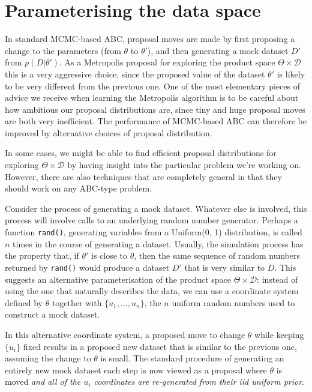 \documentclass[a4paper, 12pt]{article}
\newcommand{\params}{\theta}
\newcommand{\data}{D}
\begin{document}
\section{Parameterising the data space}
In standard MCMC-based ABC, proposal moves are made by first proposing a
change to the parameters (from $\params$ to $\params'$), and then generating
a mock dataset $\data'$ from $p(\data | \params')$. As a Metropolis proposal
for exploring the product space $\Theta \times \mathcal{D}$ this is a very
aggressive choice, since the proposed value of the
dataset $\params'$ is likely to be very different from the previous one.
One of the most elementary pieces of advice we receive when learning the
Metropolis algorithm is to be careful about how ambitious our proposal
distributions are, since tiny and huge proposal moves are both very
inefficient. The performance of MCMC-based ABC can therefore be improved by
alternative choices of proposal distribution.

In some cases, we might be able to find efficient proposal distributions for exploring $\Theta \times \mathcal{D}$ by having insight into the particular
problem we're working on. However, there are also techniques that are
completely general in that they should work on any ABC-type problem.

Consider the process of generating a mock dataset. Whatever else is involved,
this process will involve calls to an underlying random number generator.
Perhaps a function {\tt rand()}, generating variables from a Uniform(0, 1)
distribution, is called $n$ times in the course of generating a dataset.
Usually, the simulation process has the property that, if $\theta'$ is
close to $\theta$, then the same sequence of random numbers returned by
{\tt rand()} would produce a dataset $\data'$ that is very similar to $\data$.
This suggests an alternative parameterisation of
the product space $\Theta\times\mathcal{D}$: instead of using the one that
naturally describes the data, we can use a coordinate system defined by
$\theta$ together with $\{u_1, ..., u_n\}$, the $n$ uniform random numbers
used to construct a mock dataset.

In this alternative coordinate system, a proposed move
to change $\params$ while keeping
$\{u_i\}$ fixed results in a proposed new dataset that is similar to the
previous one, assuming the change to $\params$ is small. The standard procedure
of generating an entirely new mock dataset each step is now viewed as a
proposal where $\params$ is moved {\it and all of the $u_i$ coordinates are
re-generated from their iid uniform prior}.
\end{document}
